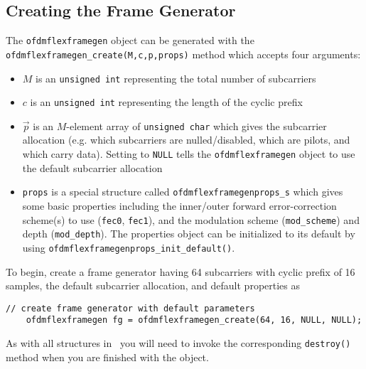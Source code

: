 \subsection{Creating the Frame Generator}
\label{tutorial:ofdmflexframe:framegen}
%
The {\tt ofdmflexframegen} object can be generated with the
{\tt ofdmflexframegen\_create(M,c,p,props)} method which accepts four arguments:
%
\begin{itemize}
\item $M$ is an {\tt unsigned int} representing the total number of
    subcarriers
\item $c$ is an {\tt unsigned int} representing the length of the
    cyclic prefix
\item $\vec{p}$ is an $M$-element array of {\tt unsigned char} which
    gives the subcarrier allocation (e.g. which subcarriers
    are nulled/disabled, which are pilots, and which carry data).
    Setting to {\tt NULL} tells the {\tt ofdmflexframegen} object to use
    the default subcarrier allocation
\item {\tt props} is a special structure called
    {\tt ofdmflexframegenprops\_s}
    which gives some basic properties including
    the inner/outer forward error-correction scheme(s) to use
    ({\tt fec0}, {\tt fec1}),
    and the modulation scheme ({\tt mod\_scheme}) and depth
    ({\tt mod\_depth}).
    The properties object can be initialized to its default by using
    {\tt ofdmflexframegenprops\_init\_default()}.
\end{itemize}
%
To begin, create a frame generator having 64 subcarriers with cyclic
prefix of 16 samples, the default subcarrier allocation, and
default properties as
%
\begin{Verbatim}[fontsize=\small]
    // create frame generator with default parameters
    ofdmflexframegen fg = ofdmflexframegen_create(64, 16, NULL, NULL);
\end{Verbatim}
%
As with all structures in \liquid\ you will need to invoke the
corresponding {\tt destroy()} method when you are finished with the
object.

